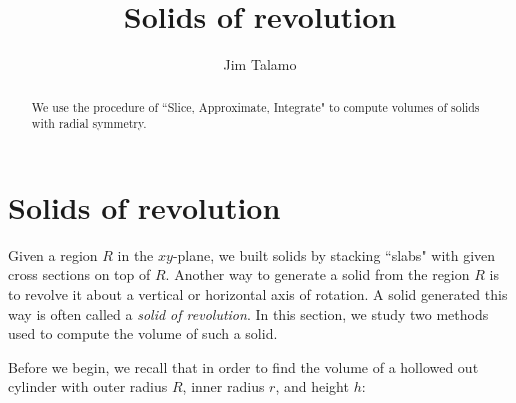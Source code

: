 \documentclass{ximera}
\author{Jim Talamo}
\title[Dig-In:]{Solids of revolution}
\begin{document}
\begin{abstract}
  We use the procedure of ``Slice, Approximate, Integrate" to compute volumes of solids with radial symmetry.
\end{abstract}
\maketitle


\section{Solids of revolution}

Given a region $R$ in the $xy$-plane, we built solids by stacking ``slabs" with given cross sections on top of $R$.  Another way to generate a solid from the region $R$ is to revolve it about a vertical or horizontal axis of rotation.  A solid generated this way is often called a \emph{solid of revolution}. In this section, we study two methods used to compute the volume of such a solid.

Before we begin, we recall that in order to find the volume of a hollowed out cylinder with outer radius $R$, inner radius $r$, and height $h$:

\begin{image}
\end{image}
\end{document}
